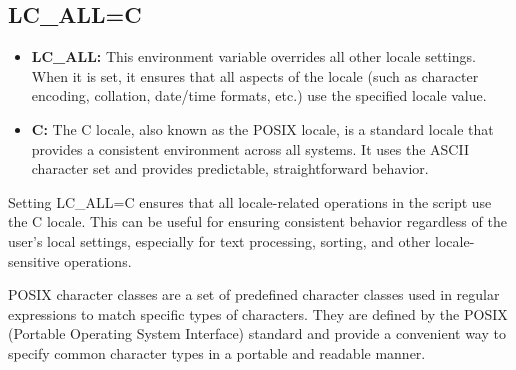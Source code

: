 \documentclass{report}
\begin{document}
\bigbreak \noindent 
\subsection{LC\_ALL=C}
\begin{itemize}
    \item \textbf{LC\_ALL:} This environment variable overrides all other locale settings. When it is set, it ensures that all aspects of the locale (such as character encoding, collation, date/time formats, etc.) use the specified locale value.
    \item \textbf{C:} The C locale, also known as the POSIX locale, is a standard locale that provides a consistent environment across all systems. It uses the ASCII character set and provides predictable, straightforward behavior.
\end{itemize}
\bigbreak \noindent 
Setting LC\_ALL=C ensures that all locale-related operations in the script use the C locale. This can be useful for ensuring consistent behavior regardless of the user's local settings, especially for text processing, sorting, and other locale-sensitive operations.

\pagebreak 
{}
\bigbreak \noindent 
\begin{concept}
    POSIX character classes are a set of predefined character classes used in regular expressions to match specific types of characters. They are defined by the POSIX (Portable Operating System Interface) standard and provide a convenient way to specify common character types in a portable and readable manner.
\end{concept}
\bigbreak \noindent 
\end{document}
